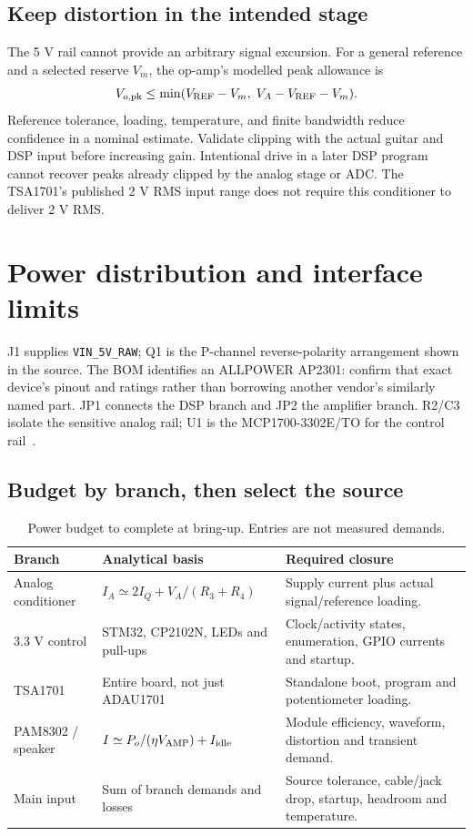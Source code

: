 \documentclass[a4paper,10pt]{article}
\newcommand{\nextsection}[1]{\clearpage\section{#1}}
\newcommand{\net}[1]{\texttt{#1}}
\begin{document}
\subsection{Keep distortion in the intended stage}
The 5 V rail cannot provide an arbitrary signal excursion. For a general reference and a selected reserve $V_m$, the op-amp's modelled peak allowance is
\begin{equation}
V_{o,\rm pk}\le\min(V_{\rm REF}-V_m,\;V_A-V_{\rm REF}-V_m).
\end{equation}
Reference tolerance, loading, temperature, and finite bandwidth reduce confidence in a nominal estimate. Validate clipping with the actual guitar and DSP input before increasing gain. Intentional drive in a later DSP program cannot recover peaks already clipped by the analog stage or ADC. The TSA1701's published 2 V RMS input range does not require this conditioner to deliver 2 V RMS.

\nextsection{Power distribution and interface limits}
\label{sec:power}
J1 supplies \net{VIN\_5V\_RAW}; Q1 is the P-channel reverse-polarity arrangement shown in the source. The BOM identifies an ALLPOWER AP2301: confirm that exact device's pinout and ratings rather than borrowing another vendor's similarly named part. JP1 connects the DSP branch and JP2 the amplifier branch. R2/C3 isolate the sensitive analog rail; U1 is the MCP1700-3302E/TO for the control rail~\cite{mcp1700}.

\subsection{Budget by branch, then select the source}
\begin{table}[H]\centering\small
\caption{Power budget to complete at bring-up. Entries are not measured demands.}\label{tab:power}
\begin{tabularx}{\linewidth}{P{29mm}P{47mm}Y}\toprule
Branch & Analytical basis & Required closure\\\midrule
Analog conditioner & $I_A\simeq2I_Q+V_A/(R_3+R_4)$ & Supply current plus actual signal/reference loading.\\
3.3 V control & STM32, CP2102N, LEDs and pull-ups & Clock/activity states, enumeration, GPIO currents and startup.\\
TSA1701 & Entire board, not just ADAU1701 & Standalone boot, program and potentiometer loading.\\
PAM8302 / speaker & $I\simeq P_o/(\eta V_{\rm AMP})+I_{\rm idle}$ & Module efficiency, waveform, distortion and transient demand.\\
Main input & Sum of branch demands and losses & Source tolerance, cable/jack drop, startup, headroom and temperature.\\\bottomrule
\end{tabularx}
\end{table}
\end{document}
